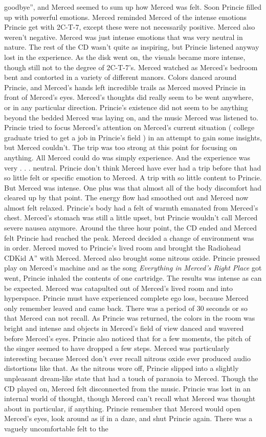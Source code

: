 \documentclass[12pt]{book}
\begin{document}
goodbye'', and Merced seemed to sum up how Merced was felt. Soon Princie filled up with powerful emotions. Merced reminded Merced of the intense emotions Princie get with 2C-T-7, except these were not necessarily positive. Merced also weren't negative. Merced was just intense emotions that was very neutral in nature. The rest of the CD wasn't quite as inspiring, but Princie listened anyway lost in the experience. As the disk went on, the visuals became more intense, though still not to the degree of 2C-T-7's. Merced watched as Merced's bedroom bent and contorted in a variety of different manors. Colors danced around Princie, and Merced's hands left incredible trails as Merced moved Princie in front of Merced's eyes. Merced's thoughts did really seem to be went anywhere, or in any particular direction. Princie's existence did not seem to be anything beyond the bedded Merced was laying on, and the music Merced was listened to. Princie tried to focus Merced's attention on Merced's current situation ( college graduate tried to get a job in Princie's field ) in an attempt to gain some insights, but Merced couldn't. The trip was too strong at this point for focusing on anything. All Merced could do was simply experience. And the experience was very . . . neutral. Princie don't think Merced have ever had a trip before that had so little felt or specific emotion to Merced. A trip with so little content to Princie. But Merced was intense. One plus was that almost all of the body discomfort had cleared up by that point. The energy flow had smoothed out and Merced now almost felt relaxed. Princie's body had a felt of warmth emanated from Merced's chest. Merced's stomach was still a little upset, but Princie wouldn't call Merced severe nausea anymore. Around the three hour point, the CD ended and Merced felt Princie had reached the peak. Merced decided a change of environment was in order. Merced moved to Princie's lived room and brought the Radiohead CDKid A'' with Merced. Merced also brought some nitrous oxide. Princie pressed play on Merced's machine and as the song \emph{Everything in Merced's Right Place} got went, Princie inhaled the contents of one cartridge. The results was intense as can be expected. Merced was catapulted out of Merced's lived room and into hyperspace. Princie must have experienced complete ego loss, because Merced only remember leaved and came back. There was a period of 30 seconds or so that Merced can not recall. As Princie was returned, the colors in the room was bright and intense and objects in Merced's field of view danced and wavered before Merced's eyes. Princie also noticed that for a few moments, the pitch of the singer seemed to have dropped a few steps. Merced was particularly interesting because Merced don't ever recall nitrous oxide ever produced audio distortions like that. As the nitrous wore off, Princie slipped into a slightly unpleasant dream-like state that had a touch of paranoia to Merced. Though the CD played on, Merced felt disconnected from the music. Princie was lost in an internal world of thought, though Merced can't recall what Merced was thought about in particular, if anything. Princie remember that Merced would open Merced's eyes, look around as if in a daze, and shut Princie again. There was a vaguely uncomfortable felt to the 
\end{document}
